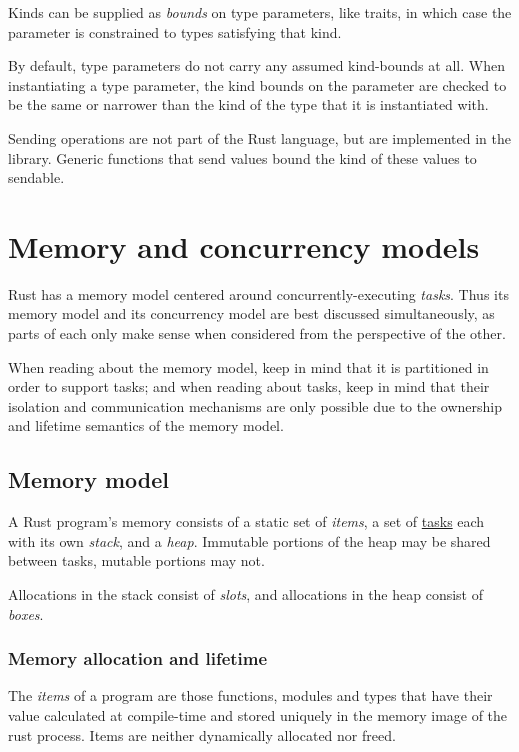 \documentclass[]{article}
\begin{document}
Kinds can be supplied as \emph{bounds} on type parameters, like traits,
in which case the parameter is constrained to types satisfying that
kind.

By default, type parameters do not carry any assumed kind-bounds at all.
When instantiating a type parameter, the kind bounds on the parameter
are checked to be the same or narrower than the kind of the type that it
is instantiated with.

Sending operations are not part of the Rust language, but are
implemented in the library. Generic functions that send values bound the
kind of these values to sendable.

\section{Memory and concurrency
models}\label{memory-and-concurrency-models}

Rust has a memory model centered around concurrently-executing
\emph{tasks}. Thus its memory model and its concurrency model are best
discussed simultaneously, as parts of each only make sense when
considered from the perspective of the other.

When reading about the memory model, keep in mind that it is partitioned
in order to support tasks; and when reading about tasks, keep in mind
that their isolation and communication mechanisms are only possible due
to the ownership and lifetime semantics of the memory model.

\subsection{Memory model}\label{memory-model}

A Rust program's memory consists of a static set of \emph{items}, a set
of \hyperref[tasks]{tasks} each with its own \emph{stack}, and a
\emph{heap}. Immutable portions of the heap may be shared between tasks,
mutable portions may not.

Allocations in the stack consist of \emph{slots}, and allocations in the
heap consist of \emph{boxes}.

\subsubsection{Memory allocation and
lifetime}\label{memory-allocation-and-lifetime}

The \emph{items} of a program are those functions, modules and types
that have their value calculated at compile-time and stored uniquely in
the memory image of the rust process. Items are neither dynamically
allocated nor freed.
\end{document}
